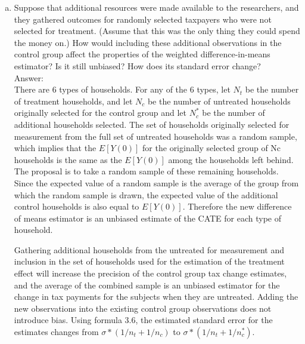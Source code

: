 \documentclass[11pt,notitlepage]{article}\usepackage[]{graphicx}\usepackage[]{color}
\begin{document}
\begin{enumerate}[a)]
\item Suppose that additional resources were made available to the researchers, and they gathered outcomes for randomly selected taxpayers who were not selected for treatment. (Assume that this was the only thing they could spend the money on.) How would including these additional observations in the control group affect the properties of the weighted difference-in-means estimator? Is it still unbiased? How does its standard error change?\\
Answer:\\
There are 6 types of households. For any of the 6 types, let $N_t$ be the number of treatment households, and let $N_c$ be the number of untreated households originally selected for the control group and let $N_c^{*}$ be the number of additional households selected. The set of households originally selected for measurement from the full set of untreated households was a random sample, which implies that the $E[Y(0)]$ for the originally selected group of Nc households is the same as the $E[Y(0)]$ among the households left behind. The proposal is to take a random sample of these remaining households. Since the expected value of a random sample is the average of the group from which the random sample is drawn, the expected value of the additional control households is also equal to $E[Y(0)]$. Therefore the new difference of means estimator is an unbiased estimate of the CATE for each type of household.

Gathering additional households from the untreated for measurement and inclusion in the set of households used for the estimation of the treatment effect will increase the precision of the control group tax change estimates, and the average of the combined sample is an unbiased estimator for the change in tax payments for the subjects when they are untreated. Adding the new observations into the existing control group observations does not introduce bias. Using formula 3.6, the estimated standard error for the estimates changes from $\sigma*(1/n_t + 1/n_c)$ to $\sigma*(1/n_t + 1/n_c^{*})$. 


\end{enumerate}
\end{document}
